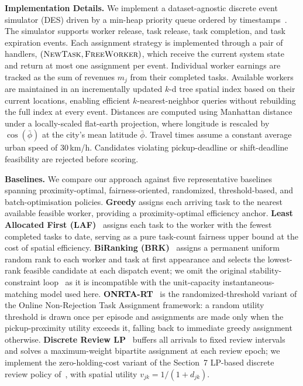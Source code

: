 \textbf{Implementation Details.}
\label{sec:framework}
We implement a dataset-agnostic discrete event simulator (DES) driven by a min-heap priority queue ordered by timestamps~\cite{tong2019survey}. The simulator supports worker release, task release, task completion, and task expiration events. Each assignment strategy is implemented through a pair of handlers, $(\textsc{NewTask}, \textsc{FreeWorker})$, which receive the current system state and return at most one assignment per event. Individual worker earnings are tracked as the sum of revenues $m_j$ from their completed tasks. Available workers are maintained in an incrementally updated $k$-d tree spatial index based on their current locations, enabling efficient $k$-nearest-neighbor queries without rebuilding the full index at every event. Distances are computed using Manhattan distance under a locally-scaled flat-earth projection, where longitude is rescaled by $\cos(\bar{\phi})$ at the city's mean latitude $\bar{\phi}$. Travel times assume a constant average urban speed of 30\,km/h. Candidates violating pickup-deadline or shift-deadline feasibility are rejected before scoring.


\textbf{Baselines.}
We compare our approach against five representative baselines spanning
proximity-optimal, fairness-oriented, randomized, threshold-based, and
batch-optimisation policies.
\textbf{Greedy} assigns each arriving task to the nearest available feasible
worker, providing a proximity-optimal efficiency anchor.
\textbf{Least Allocated First (LAF)}~\cite{CR-04} assigns each task to the
worker with the fewest completed tasks to date, serving as a pure task-count
fairness upper bound at the cost of spatial efficiency.
\textbf{BiRanking (BRK)}~\cite{LM-04} assigns a permanent uniform random rank
to each worker and task at first appearance and selects the lowest-rank feasible
candidate at each dispatch event; we omit the original stability-constraint
loop~\cite{LM-04} as it is incompatible with the unit-capacity
instantaneous-matching model used here.
\textbf{ONRTA-RT}~\cite{LM-03} is the randomized-threshold variant of the
Online Non-Rejection Task Assignment framework: a random utility threshold is
drawn once per episode and assignments are made only when the pickup-proximity
utility exceeds it, falling back to immediate greedy assignment otherwise.
\textbf{Discrete Review LP}~\cite{aveklouris2023matchingimpatientheterogeneousdemand} buffers all arrivals to fixed review
intervals and solves a maximum-weight bipartite assignment at each review epoch;
we implement the zero-holding-cost variant of the Section~7 LP-based discrete
review policy of~\cite{aveklouris2023matchingimpatientheterogeneousdemand}, with spatial utility $v_{jk} = 1/(1 + d_{jk})$.

